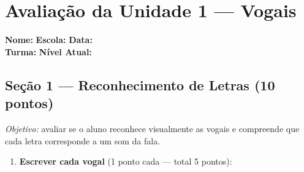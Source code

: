 
\section{Avaliação da Unidade 1 --- Vogais}

\begin{avaliacao}
\begin{center}
\end{center}

\vspace{0.5em}
\noindent\textbf{Nome:} \underline{\hspace{5cm}} \quad
\textbf{Escola:} \underline{\hspace{4cm}} \quad
\textbf{Data:} \underline{\hspace{2.5cm}}\\[0.5em]
\noindent\textbf{Turma:} \underline{\hspace{2cm}} \quad
\textbf{N\'{i}vel Atual:} \underline{\hspace{3cm}}

\subsection*{Seção 1 — Reconhecimento de Letras (10 pontos)}

\textit{Objetivo:} avaliar se o aluno reconhece visualmente as vogais
e compreende que cada letra corresponde a um som da fala.

\begin{enumerate}
  \item \textbf{Escrever cada vogal} (1 ponto cada — total 5 pontos):


\end{enumerate}
\end{avaliacao}
